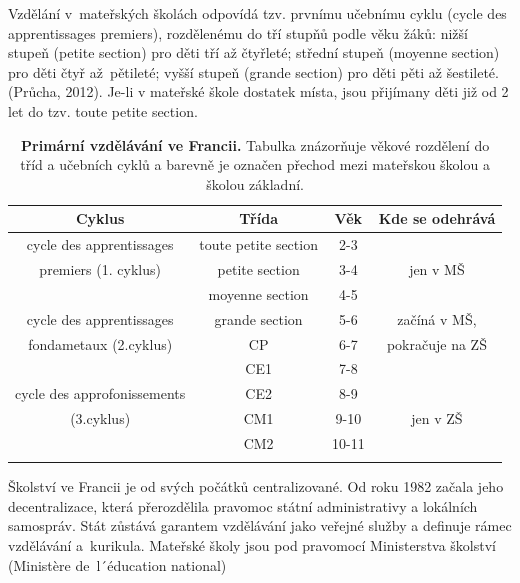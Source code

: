 		Vzdělání v mateřských školách odpovídá tzv. prvnímu učebnímu cyklu (cycle des apprentissages premiers), rozdělenému do tří stupňů podle věku žáků: nižší stupeň (petite section) pro děti tří až čtyřleté; střední stupeň (moyenne section) pro děti čtyř až pětileté; vyšší stupeň (grande section) pro děti pěti až šestileté.
		(Průcha, 2012). 
		Je-li v mateřské škole dostatek místa, jsou přijímany děti již od 2 let do tzv. toute petite section. 

\begin{spacing}{1.0}
\begin{table}[h]
	\small
	\begin{center}
	\begin{tabular}{|c|ccc|}
		\hline
		\rowcolor{grey}
		\textbf{Cyklus}				& \textbf{Třída}		& \textbf{Věk}	& \textbf{Kde se odehrává}	\\
		\hline
		\hline
		\rowcolor{grey!10}
	\cellcolor{white} cycle des apprentissages	& toute petite section 	& 2-3 		&				\\ \rowcolor{grey!10}
	\cellcolor{white} premiers (1. cyklus)		& petite section 		& 3-4 		& jen v MŠ 		\\ \rowcolor{grey!10}
	\cellcolor{white}							& moyenne section 		& 4-5 		& 				\\ \rowcolor{grey!10}
		\hline
	\cellcolor{white} cycle des apprentissages 	& grande section 		& 5-6 		& začíná v MŠ, 		\\ \rowcolor{grey!50}
	\cellcolor{white} fondametaux (2.cyklus) 		& CP 					& 6-7 		& pokračuje na ZŠ 	\\ \rowcolor{grey!50}
	\cellcolor{white}								& CE1 					& 7-8 		& 					\\ \rowcolor{grey!50}
		\hline
	\cellcolor{white} cycle des approfonissements & CE2 					& 8-9 		&					\\ \rowcolor{grey!50}
	\cellcolor{white} (3.cyklus)					& CM1 					& 9-10 		& jen v ZŠ 			\\ \rowcolor{grey!50}
	\cellcolor{white}								& CM2 					& 10-11 	& 					\\ \rowcolor{grey!50}
		\hline
	\end{tabular}
	\end{center}
	\caption{ \textbf{Primární vzdělávání ve Francii.} Tabulka znázorňuje věkové rozdělení do tříd a učebních cyklů a barevně je označen přechod mezi mateřskou školou a školou základní. 
	}
	\label{tab:rozdeleniTridCR}
\end{table}
\end{spacing}
		Školství ve Francii je od svých počátků centralizované. Od roku 1982 začala jeho decentralizace, která přerozdělila pravomoc státní administrativy a lokálních samospráv. Stát zůstává garantem vzdělávání jako veřejné služby a definuje rámec vzdělávání a kurikula. Mateřské školy jsou pod pravomocí Ministerstva školství (Ministère de l´éducation national)

